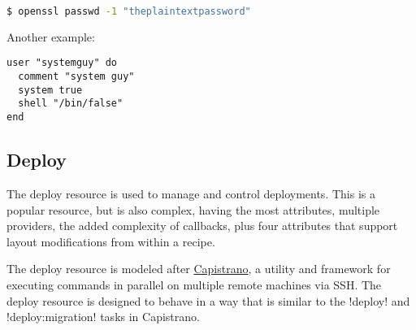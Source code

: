 \begin{lstlisting}[language=Bash,label=lst:cookbook-resources-cookbook-user2]
$ openssl passwd -1 "theplaintextpassword"
\end{lstlisting}

Another example:

\begin{lstlisting}[label=lst:cookbook-resources-cookbook-user3]
user "systemguy" do
  comment "system guy"
  system true
  shell "/bin/false"
end
\end{lstlisting}

\subsection{Deploy}

The deploy resource is used to manage and control deployments. This is a popular resource, but is also complex, having the most attributes, multiple providers, the added complexity of callbacks, plus four attributes that support layout modifications from within a recipe.

The deploy resource is modeled after \href{http://capistranorb.com/}{Capistrano}, a utility and framework for executing commands in parallel on multiple remote machines via SSH. The deploy resource is designed to behave in a way that is similar to the \inline!deploy! and \inline!deploy:migration! tasks in Capistrano.